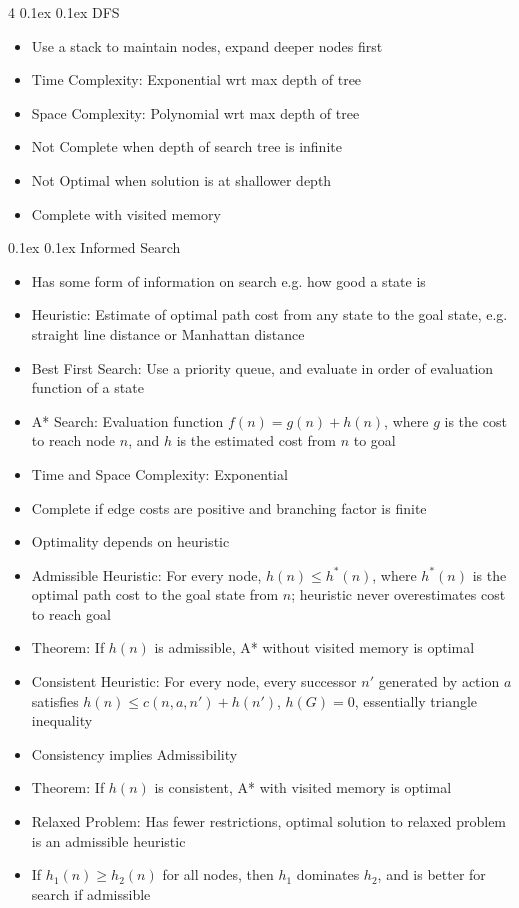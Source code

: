 \documentclass[10pt, landscape]{article}
\makeatletter
\renewcommand{\section}{\@startsection{section}{1}{0mm}%
  {0.1ex} %
  {0.1ex} %
  {\normalfont\large\bfseries}}
\renewcommand{\subsection}{\@startsection{subsection}{2}{0mm}%
  {0.1ex} %
  {0.1ex} %
  {\normalfont\normalsize\bfseries}}
\makeatother
\begin{document}
\begin{multicols*}{4}
\subsection{DFS}
\begin{itemize}
    \item Use a stack to maintain nodes, expand deeper nodes first
    \item Time Complexity: Exponential wrt max depth of tree
    \item Space Complexity: Polynomial wrt max depth of tree
    \item Not Complete when depth of search tree is infinite
    \item Not Optimal when solution is at shallower depth
    \item Complete with visited memory
\end{itemize}

\section{Informed Search}
\begin{itemize}
    \item Has some form of information on search e.g. how good a state is
    \item Heuristic: Estimate of optimal path cost from any state to the goal state, e.g. straight line distance or Manhattan distance
    \item Best First Search: Use a priority queue, and evaluate in order of evaluation function of a state
    \item A* Search: Evaluation function $f(n)=g(n)+h(n)$, where $g$ is the cost to reach node $n$, and $h$ is the estimated cost from $n$ to goal
    \item Time and Space Complexity: Exponential
    \item Complete if edge costs are positive and branching factor is finite
    \item Optimality depends on heuristic
    \item Admissible Heuristic: For every node, $h(n) \leq h^*(n)$, where $h^*(n)$ is the optimal path cost to the goal state from $n$; heuristic never overestimates cost to reach goal
    \item Theorem: If $h(n)$ is admissible, A* without visited memory is optimal
    \item Consistent Heuristic: For every node, every successor $n'$ generated by action $a$ satisfies $h(n) \leq c(n,a,n')+h(n')$, $h(G)=0$, essentially triangle inequality
    \item Consistency implies Admissibility
    \item Theorem: If $h(n)$ is consistent, A* with visited memory is optimal
    \item Relaxed Problem: Has fewer restrictions, optimal solution to relaxed problem is an admissible heuristic
    \item If $h_1(n) \geq h_2(n)$ for all nodes, then $h_1$ dominates $h_2$, and is better for search if admissible
\end{itemize}


\end{multicols*}
\end{document}
